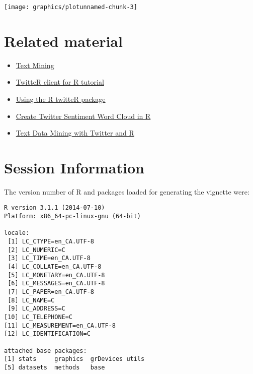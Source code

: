 \documentclass[9pt,english]{extarticle}\usepackage[]{graphicx}\usepackage[]{color}
\makeatletter
\newenvironment{kframe}{%
 \def\at@end@of@kframe{}%
 \ifinner\ifhmode%
  \def\at@end@of@kframe{\end{minipage}}%
  \begin{minipage}{\columnwidth}%
 \fi\fi%
 \def\FrameCommand##1{\hskip\@totalleftmargin \hskip-\fboxsep
 \colorbox{shadecolor}{##1}\hskip-\fboxsep
     \hskip-\linewidth \hskip-\@totalleftmargin \hskip\columnwidth}%
 \MakeFramed {\advance\hsize-\width
   \@totalleftmargin\z@ \linewidth\hsize
   \@setminipage}}%
 {\par\unskip\endMakeFramed%
 \at@end@of@kframe}
\newenvironment{knitrout}{}{} %
\makeatother
\begin{document}
\begin{linenumbers}
\begin{knitrout}
{\centering \texttt{[image: graphics/plotunnamed-chunk-3]} 

}



\end{knitrout}

\section{Related material}
\label{sec:material}

\noindent
\begin{itemize}
\item \href{http://www.rdatamining.com/examples/text-mining}{Text Mining}
\item \href{http://geoffjentry.hexdump.org/twitteR.pdf}{TwitteR client for R tutorial}
\item \href{http://davetang.org/muse/2013/04/06/using-the-r_twitter-package/}{Using the R twitteR package}
\item \href{http://thinktostart.com/create-twitter-sentiment-word-cloud-in-r/}{Create Twitter Sentiment Word Cloud in R}
  \item \href{http://heuristically.wordpress.com/2011/04/08/text-data-mining-twitter-r/}{Text Data Mining with Twitter and R}
\end{itemize}



\section{Session Information}
\label{sec:sess_Information}

\noindent
The version number of R and packages loaded for generating the vignette were:
\begin{knitrout}
\color{fgcolor}\begin{kframe}
\begin{verbatim}
R version 3.1.1 (2014-07-10)
Platform: x86_64-pc-linux-gnu (64-bit)

locale:
 [1] LC_CTYPE=en_CA.UTF-8      
 [2] LC_NUMERIC=C              
 [3] LC_TIME=en_CA.UTF-8       
 [4] LC_COLLATE=en_CA.UTF-8    
 [5] LC_MONETARY=en_CA.UTF-8   
 [6] LC_MESSAGES=en_CA.UTF-8   
 [7] LC_PAPER=en_CA.UTF-8      
 [8] LC_NAME=C                 
 [9] LC_ADDRESS=C              
[10] LC_TELEPHONE=C            
[11] LC_MEASUREMENT=en_CA.UTF-8
[12] LC_IDENTIFICATION=C       

attached base packages:
[1] stats     graphics  grDevices utils    
[5] datasets  methods   base     


\end{verbatim}
\end{kframe}
\end{knitrout}
\end{linenumbers}
\end{document}
